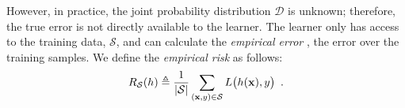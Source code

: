 However, in practice, the joint probability distribution $\mathcal{D}$ is unknown; therefore, the true error is not directly available to the learner.
The learner only has access to the training data, $\mathcal{S}$, and can calculate the \emph{empirical error} \ie, the error over the training samples.
We define the \emph{empirical risk} as follows:
\begin{equation}
  R_{\mathcal{S}}(h) \triangleq \frac{1}{|\mathcal{S}|} \sum_{(\mathbf{x}, y) \in \mathcal{S}} L\big( h(\mathbf{x}), y \big) \enspace.
\end{equation}




